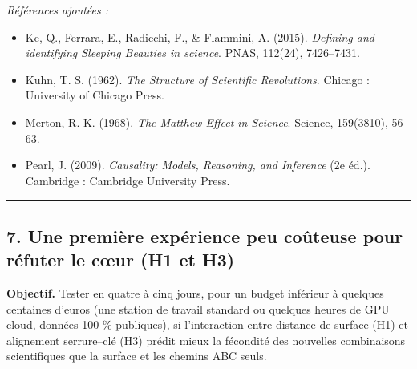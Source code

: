 \documentclass[a4paper,11pt]{article}
\providecommand{\tightlist}{\setlength{\itemsep}{0pt}\setlength{\parskip}{0pt}}
\begin{document}
\emph{Références ajoutées :}

\begin{itemize}
\tightlist
\item
  Ke, Q., Ferrara, E., Radicchi, F., \& Flammini, A. (2015).
  \emph{Defining and identifying Sleeping Beauties in science}. PNAS,
  112(24), 7426--7431.
\item
  Kuhn, T. S. (1962). \emph{The Structure of Scientific Revolutions}.
  Chicago : University of Chicago Press.
\item
  Merton, R. K. (1968). \emph{The Matthew Effect in Science}. Science,
  159(3810), 56--63.
\item
  Pearl, J. (2009). \emph{Causality: Models, Reasoning, and Inference}
  (2e éd.). Cambridge : Cambridge University Press.
\end{itemize}

\begin{center}\rule{0.5\linewidth}{0.5pt}\end{center}

\subsection*{7. Une première expérience peu coûteuse pour réfuter le cœur
(H1 et H3)}

\textbf{Objectif.} Tester en quatre à cinq jours, pour un budget
inférieur à quelques centaines d'euros (une station de travail standard
ou quelques heures de GPU cloud, données 100 \% publiques), si
l'interaction entre distance de surface (H1) et alignement serrure--clé
(H3) prédit mieux la fécondité des nouvelles combinaisons scientifiques
que la surface et les chemins ABC seuls.
\end{document}
